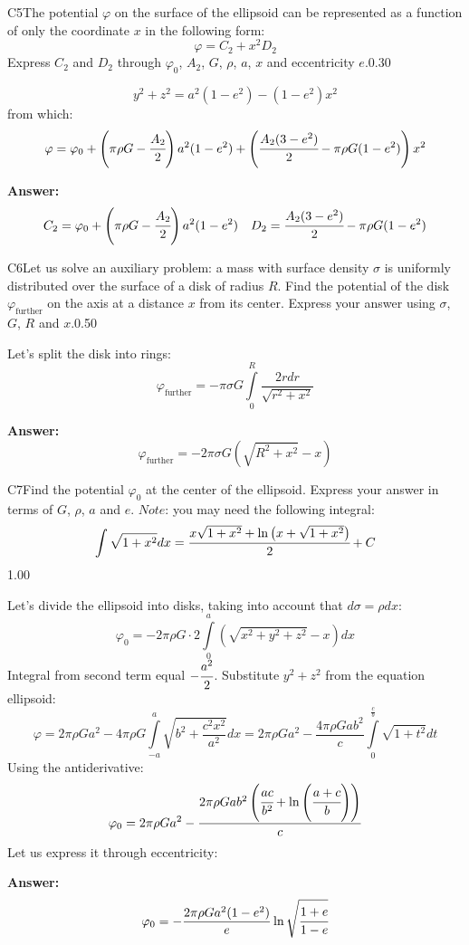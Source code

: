 \documentclass[11pt,a4paper]{article}
\begin{document}
\begin{solcard}{C5}{The potential $\varphi$ on the surface of the ellipsoid can be represented as a function of only the coordinate $x$ in the following form: $$\varphi=C_2+x^2D_2 $$ Express $C_2$ and $D_2$ through $\varphi_0$, $A_2$, $G$, $\rho$, $a$, $x$ and eccentricity $e$.}{0.30}

$$y^2+z^2=a^2(1-e^2)-(1-e^2)x^2 $$ from which: $$\varphi=\varphi_0+\left(\pi\rho G-\cfrac{A_2}{2}\right)a^2(1-e^2)+\left(\cfrac{A_2(3-e^2)}{2}-\pi\rho G(1-e^2)\right)x^2 $$

\par\smallskip\noindent\textbf{Answer:} $$C_2=\varphi_0+\left(\pi\rho G-\cfrac{A_2}{2}\right)a^2(1-e^2) \quad D_2=\cfrac{A_2(3-e^2)}{2}-\pi\rho G(1-e^2) $$
\end{solcard}

\begin{solcard}{C6}{Let us solve an auxiliary problem: a mass with surface density $\sigma$ is uniformly distributed over the surface of a disk of radius $R$. Find the potential of the disk $\varphi_\text{further}$ on the axis at a distance $x$ from its center. Express your answer using $\sigma$, $G$, $R$ and $x$.}{0.50}

Let's split the disk into rings: $$\varphi_\text{further}=-\pi\sigma G\int\limits_0^R\frac{2rdr}{\sqrt{r^2+x^2}} $$

\par\smallskip\noindent\textbf{Answer:} $$\varphi_\text{further}=-2\pi\sigma G\left(\sqrt{R^2+x^2}-x\right) $$
\end{solcard}

\begin{solcard}{C7}{Find the potential $\varphi_0$ at the center of the ellipsoid. Express your answer in terms of $G$, $\rho$, $a$ and $e$. $\textit{Note:}$ you may need the following integral: $$\displaystyle\int\sqrt{1+x^2}dx=\cfrac{x\sqrt{1+x^2}+\ln\left(x+\sqrt{1+x^2}\right)}{2}+C $$}{1.00}

Let's divide the ellipsoid into disks, taking into account that $d\sigma=\rho dx$: $$\varphi_0=-2\pi\rho G\cdot{2\int\limits_{0}^a\left(\sqrt{x^2+y^2+z^2}-x\right)dx} $$ Integral from second term equal $-\cfrac{a^2}{2}$. Substitute $y^2+z^2$ from the equation ellipsoid: $$\varphi=2\pi\rho Ga^2-4\pi\rho G\int\limits_{-a}^a\sqrt{b^2+\frac{c^2x^2}{a^2}}dx=2\pi\rho Ga^2-\frac{4\pi\rho G ab^2}{c}\int\limits_0^{\frac{c}{b}}\sqrt{1+t^2}dt $$ Using the antiderivative: $$\varphi_0=2\pi\rho Ga^2-\frac{2\pi\rho G ab^2\left(\cfrac{ac}{b^2}+\ln\left(\cfrac{a+c}{b}\right)\right)}{c} $$ Let us express it through eccentricity:

\par\smallskip\noindent\textbf{Answer:} $$\varphi_0=-\frac{2\pi\rho Ga^2(1-e^2)}{e}\ln\sqrt{\cfrac{1+e}{1-e}} $$
\end{solcard}
\end{document}
